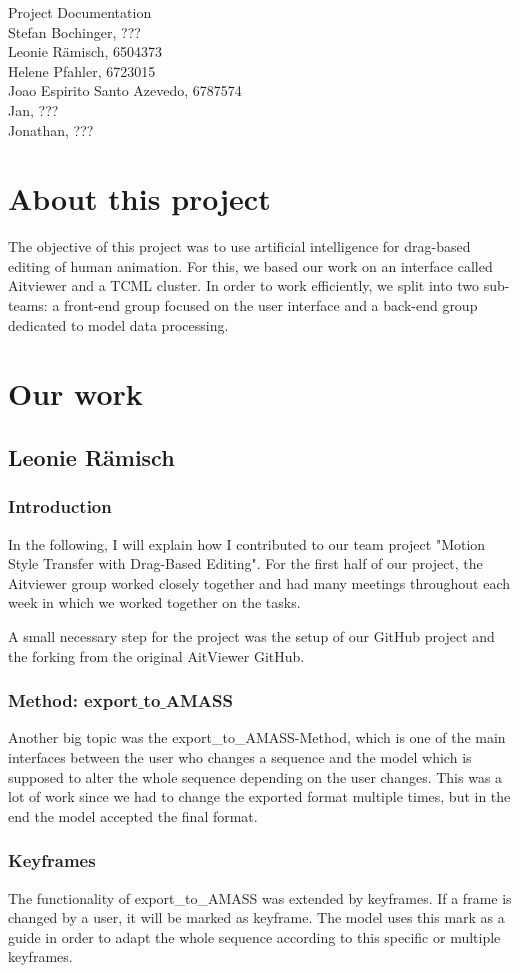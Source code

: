 \documentclass[a4paper]{scrartcl}
\def\header#1#2{
  \begin{center}
    {\Large Project Documentation}\\
    {Stefan Bochinger, ???}\\
    {Leonie Rämisch, 6504373}\\
    {Helene Pfahler, 6723015}\\
    {Joao Espirito Santo Azevedo, 6787574}\\
    {Jan, ???}\\
    {Jonathan, ???}
  \end{center}
}
\begin{document}
\header{Nr. \NUMBER}{\DEADLINE}

\section*{About this project}
The objective of this project was to use artificial intelligence for drag-based editing of human animation. For this, we based our work on an interface called Aitviewer and a TCML cluster. 
In order to work efficiently, we split into two sub-teams: a front-end group focused on the user interface and a back-end group dedicated to model data processing.  

\section*{Our work}

\subsection*{Leonie Rämisch}
\subsubsection*{Introduction}
In the following, I will explain how I contributed to our team project "Motion Style Transfer with Drag-Based Editing". For the first half of our project, the Aitviewer group worked closely together and had many meetings throughout each week in which we worked together on the tasks. 

A small necessary step for the project was the setup of our GitHub project and the forking from the original AitViewer GitHub.

\subsubsection*{Method: export$\_$to$\_$AMASS}
Another big topic was the export\_to\_AMASS-Method, which is one of the main interfaces between the user who changes a sequence and the model which is supposed to alter the whole sequence depending on the user changes. This was a lot of work since we had to change the exported format multiple times, but in the end the model accepted the final format.

\subsubsection*{Keyframes}
The functionality of export\_to\_AMASS was extended by keyframes. If a frame is changed by a user, it will be marked as keyframe. The model uses this mark as a guide in order to adapt the whole sequence according to this specific or multiple keyframes.
\end{document}

